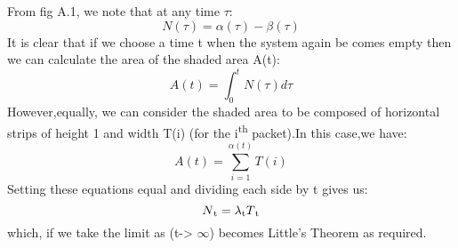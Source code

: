 \par From fig A.1, we note that at any time $\tau$:
\begin{equation}
    N(\tau) = \alpha(\tau) - \beta(\tau)
\end{equation}
It is clear that if we choose a time t when the system again be comes empty then we can calculate the area of the shaded area A(t):
\begin{equation}
    A(t) = \int_{0}^{t} N(\tau) d\tau
\end{equation}
However,equally, we can consider the shaded area to be composed of horizontal strips of height 1 and width T(i) (for the i\textsuperscript{th} packet).In this case,we have:
\begin{equation}
    A(t) = \sum_{i=1}^{\alpha(t)}T(i)
\end{equation}
Setting these equations equal and dividing each side by t gives us:
\begin{equation}
    N\textsubscript{t} = \lambda\textsubscript{t} T\textsubscript{t}
\end{equation}
which, if we take the limit as (t-> $\infty$) becomes Little's Theorem as required.